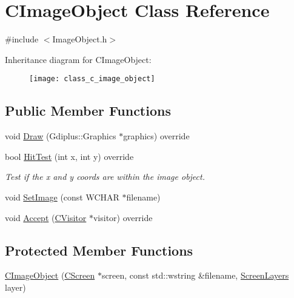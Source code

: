 \hypertarget{class_c_image_object}{}\section{C\+Image\+Object Class Reference}
\label{class_c_image_object}


{\ttfamily \#include $<$Image\+Object.\+h$>$}

Inheritance diagram for C\+Image\+Object\+:\begin{figure}[H]
\begin{center}
\leavevmode
\texttt{[image: class\_c\_image\_object]}
\end{center}
\end{figure}
\subsection*{Public Member Functions}
\begin{DoxyCompactItemize}
\item 
void \mbox{\hyperlink{class_c_image_object_a7f550785caf6f15a5a521ee69acc03c4}{Draw}} (Gdiplus\+::\+Graphics $\ast$graphics) override
\item 
bool \mbox{\hyperlink{class_c_image_object_a0b8db07f55fa820b3683d2a99d553120}{Hit\+Test}} (int x, int y) override
\begin{DoxyCompactList}\small\item\em Test if the x and y coords are within the image object. \end{DoxyCompactList}\item 
void \mbox{\hyperlink{class_c_image_object_adbcb139e0a30fb3e31c70d0830723577}{Set\+Image}} (const W\+C\+H\+AR $\ast$filename)
\item 
void \mbox{\hyperlink{class_c_image_object_a7130a9fa130c2028aba6c28dcfc876d5}{Accept}} (\mbox{\hyperlink{class_c_visitor}{C\+Visitor}} $\ast$visitor) override
\end{DoxyCompactItemize}
\subsection*{Protected Member Functions}
\begin{DoxyCompactItemize}
\item 
\mbox{\hyperlink{class_c_image_object_a64d5b8b5fa0709c28aa114c24b736419}{C\+Image\+Object}} (\mbox{\hyperlink{class_c_screen}{C\+Screen}} $\ast$screen, const std\+::wstring \&filename, \mbox{\hyperlink{_screen_layers_8h_ac283065f0e546466dc00cf224c28d5ac}{Screen\+Layers}} layer)
\end{DoxyCompactItemize}
